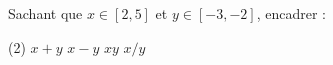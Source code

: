 %
%
	Sachant que $x \in [2,5]$ et $y \in [-3,-2]$, encadrer :
	\begin{tasks}(2)
		\task  $x+y$
		\task  $x-y$
		\task  $xy$
		\task  $x/y$
	\end{tasks}
